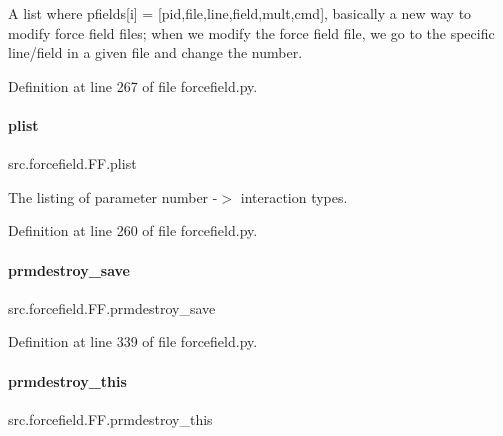 A list where pfields\mbox{[}i\mbox{]} = \mbox{[}pid,\textquotesingle{}file\textquotesingle{},line,field,mult,cmd\mbox{]}, basically a new way to modify force field files; when we modify the force field file, we go to the specific line/field in a given file and change the number. 



Definition at line 267 of file forcefield.\+py.

\mbox{\label{classsrc_1_1forcefield_1_1FF_a8feb2e88366fb38ccc3d3ffa70c10a2c}} 
\paragraph{\texorpdfstring{plist}{plist}}
{\footnotesize\ttfamily src.\+forcefield.\+F\+F.\+plist}



The listing of parameter number -\/$>$ interaction types. 



Definition at line 260 of file forcefield.\+py.

\mbox{\label{classsrc_1_1forcefield_1_1FF_ab1398de07a7eb34f034611e3009f1800}} 
\paragraph{\texorpdfstring{prmdestroy\+\_\+save}{prmdestroy\_save}}
{\footnotesize\ttfamily src.\+forcefield.\+F\+F.\+prmdestroy\+\_\+save}



Definition at line 339 of file forcefield.\+py.

\mbox{\label{classsrc_1_1forcefield_1_1FF_ab147788d898448c4e6d82e1d9d0cd7fa}} 
\paragraph{\texorpdfstring{prmdestroy\+\_\+this}{prmdestroy\_this}}
{\footnotesize\ttfamily src.\+forcefield.\+F\+F.\+prmdestroy\+\_\+this}



